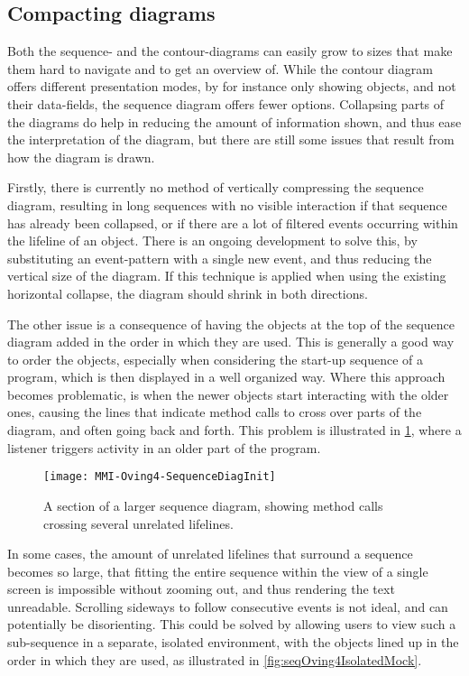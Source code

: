 \subsection{Compacting diagrams}\label{jiveSuggestionsCompact}
Both the sequence- and the contour-diagrams can easily grow to sizes that make them hard to navigate and to get an overview of.
While the contour diagram offers different presentation modes, by for instance only showing objects, and not their data-fields, the sequence diagram offers fewer options.
Collapsing parts of the diagrams do help in reducing the amount of information shown, and thus ease the interpretation of the diagram, but there are still some issues that result from how the diagram is drawn.

Firstly, there is currently no method of vertically compressing the sequence diagram, resulting in long sequences with no visible interaction if that sequence has already been collapsed, or if there are a lot of filtered events occurring within the lifeline of an object.
There is an ongoing development to solve this, by substituting an event-pattern with a single new event, and thus reducing the vertical size of the diagram.
If this technique is applied when using the existing horizontal collapse, the diagram should shrink in both directions.

The other issue is a consequence of having the objects at the top of the sequence diagram added in the order in which they are used.
This is generally a good way to order the objects, especially when considering the start-up sequence of a program, which is then displayed in a well organized way.
Where this approach becomes problematic, is when the newer objects start interacting with the older ones, causing the lines that indicate method calls to cross over parts of the diagram, and often going back and forth.
This problem is illustrated in \cref{fig:seqOving4CrossLines}, where a listener triggers activity in an older part of the program.

\begin{figure}[H]
	\centering
	\texttt{[image: MMI-Oving4-SequenceDiagInit]}
	\caption{A section of a larger sequence diagram, showing method calls crossing several unrelated lifelines.}
	\label{fig:seqOving4CrossLines}
\end{figure}

In some cases, the amount of unrelated lifelines that surround a sequence becomes so large, that fitting the entire sequence within the view of a single screen is impossible without zooming out, and thus rendering the text unreadable.
Scrolling sideways to follow consecutive events is not ideal, and can potentially be disorienting.
This could be solved by allowing users to view such a sub-sequence in a separate, isolated environment, with the objects lined up in the order in which they are used, as illustrated in \cref{fig:seqOving4IsolatedMock}.

